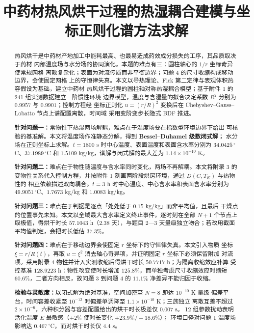 \documentclass[bwprint]{cumcmthesis}
\title{中药材热风烘干过程的热湿耦合建模与坐标正则化谱方法求解}
\begin{document}
\maketitle

\begin{abstract}
热风烘干是中药材产地加工中能耗最高、也最易造成药效成分损失的工序，其品质取决于药材
内部温度场与水分场的协同演化。本题的难点有三：圆柱轴心的 $1/r$ 坐标奇异使常规网格
离散复杂化；表面为对流传质而非平衡边界；问题 4 的尺寸收缩构成移动边界，会使固定网格
上的守恒律失真。本文以导热理论、Fick 第二定律与表观体积热容假设为基础，建立中药材
热风烘干过程的圆柱轴对称热湿耦合模型；基于附件 1 的 241 组实测数据建立一阶惯性环境
边界模型，温度与含湿量的拟合决定系数 $R^2$ 分别为 $0.9957$ 与 $0.9901$；控制方程经
坐标正则化 $u=(r/R)^2$ 变换后在 Chebyshev--Gauss--Lobatto 节点上谱配置离散，时间域
采用变阶变步长隐式 BDF 推进。

\textbf{针对问题一：}常物性下热湿两场解耦，难点在于温度场要在指数型环境边界下给出
可核验的基准解。本文将温度场作准静态分解，得到 \textbf{Bessel--Duhamel 级数闭式解}；
水分场在正则坐标上求解。$t=1800$ s 时中心温度、表面温度和表面含水率分别为
$34.0425\,^\circ$C、$37.1989\,^\circ$C 和 $1.5109$ kg/kg，谱解与闭式解的最大差为
$1.14\times10^{-10}$ K。

\textbf{针对问题二：}难点在于物性随温度与含水率同时变化，两场不再解耦。本文将附录 3
的变物性关系代入控制方程，并按附件 1 刻画两阶段烘房环境，通过 $D(C,T_K)$ 与热物性的
相互依赖描述双向耦合。$t=3$ h 时中心温度、中心含水率和表面含水率分别为
$49.9051\,^\circ$C、$1.7673$ kg/kg 和 $1.0083$ kg/kg。

\textbf{针对问题三：}难点在于判据是逐点「处处低于 $0.15$ kg/kg」而非平均值，且最后
干燥点的位置事先未知。本文以全域最大含水率定义终止事件，逐时刻在全部 $N+1$ 个节点上
取极值，得烘干时长 $57.1043$ h（$2.38$ 天），与题目 2—3 天量级独立吻合；若改用截面
平均值判定，会把时长低估 $37.3\%$。

\textbf{针对问题四：}难点在于移动边界会使固定 $r$ 坐标下的守恒律失真。本文引入物质
坐标 $\xi=r/R(t)$，再取 $u=\xi^2$ 消去轴心奇异项，并证明固定 $r$ 坐标下必须保留附加
对流项。采用附录 4 物性并计入实测收缩后得烘干时长 $50.7717$ h；为隔离收缩效应补算
受控基准 $128.9223$ h：物性改变使时长增加 $125.8\%$，而单独考虑尺寸收缩效应时缩短
$60.6\%$，二者方向相反，故问题 3 到问题 4 的 $11.1\%$ 净差异不能归因于收缩。

\textbf{检验与灵敏度：}以闭式解为绝对基准，空间加密至 $N=8$ 即达 $10^{-10}$ K 量级
偏差平台，时间容差收紧至 $10^{-12}$ 时偏差单调降至 $1.1\times10^{-10}$ K；三族独立
离散互差不超过 $2\times10^{-6}$，六种积分器与容差配置给出的烘干时长极差仅 $0.007$ s。
12 组参数扰动表明活化温度 $E$ 最敏感（$\pm2\%$ 使时长变化 $+23.9\%/-18.6\%$）；
环境口径对问题 1 温度场影响达 $0.467\,^\circ$C，而对烘干时长仅 $4.4$ s。

\end{abstract}
\end{document}
